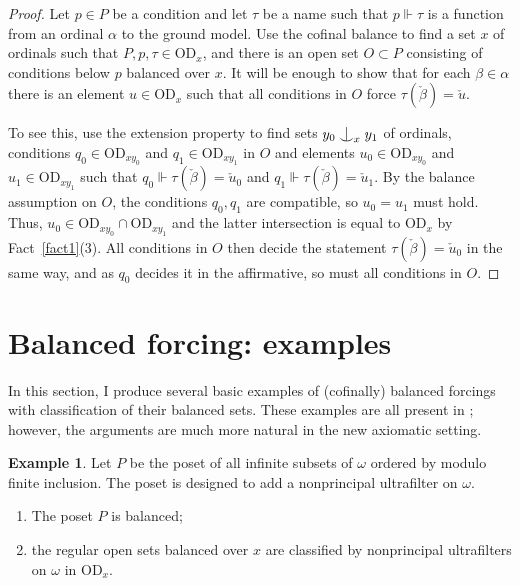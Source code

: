 \documentclass{article}
\newcommand{\ga}{\alpha}
\newcommand{\gb}{\beta}
\newcommand{\gw}{\omega}
\newcommand{\vd}{\mathrm{OD}}
\newcommand{\forkindep}[1][]{%
  \mathrel{
    \mathop{
      \vcenter{
        \hbox{\oalign{\noalign{\kern-.3ex}\hfil$\vert$\hfil\cr
              \noalign{\kern-.7ex}
              $\smile$\cr\noalign{\kern-.3ex}}}
      }
    }\displaylimits_{#1}
  }
}
\theoremstyle{definition}
\newtheorem{example}[theorem]{Example}
\begin{document}
\begin{proof}
Let $p\in P$ be a condition and let $\tau$ be a name such that $p\Vdash\tau$ is a function from an ordinal $\ga$ to the ground model. Use the cofinal balance to find a set $x$ of ordinals such that $P, p, \tau\in\vd_x$, and there is an open set $O\subset P$ consisting of conditions below $p$ balanced over $x$. It will be enough to show that for each $\gb\in\ga$ there is an element $u\in\vd_{x}$ such that all conditions in $O$ force $\tau(\check\gb)=\check u$.


To see this, use the extension property to find sets $y_0\forkindep[x]y_1$ of ordinals, conditions $q_0\in\vd_{xy_0}$ and $q_1\in\vd_{xy_1}$ in $O$ and elements $u_0\in\vd_{xy_0}$ and $u_1\in\vd_{xy_1}$ such that $q_0\Vdash\tau(\check\gb)=\check u_0$ and $q_1\Vdash\tau(\check\gb)=\check u_1$. By the balance assumption on $O$, the conditions $q_0, q_1$ are compatible, so $u_0=u_1$ must hold. Thus, $u_0\in\vd_{xy_0}\cap\vd_{xy_1}$ and the latter intersection is equal to $\vd_x$ by Fact~\ref{fact1}(3). All conditions in $O$ then decide the statement $\tau(\check\gb)=\check u_0$ in the same way, and as $q_0$ decides it in the affirmative, so must all conditions in $O$.
\end{proof}


\section{Balanced forcing: examples}
\label{examplesection}

In this section, I produce several basic examples of (cofinally) balanced forcings with classification of their balanced sets. These examples are all present in \cite{z:geometric}; however, the arguments are much more natural in the new axiomatic setting.


\begin{example}
\label{ufexample1}
Let $P$ be the poset of all infinite subsets of $\gw$ ordered by modulo finite inclusion.  The poset is designed to add a nonprincipal ultrafilter on $\gw$.

\begin{enumerate}
\item The poset $P$ is balanced;
\item the regular open sets balanced over $x$ are classified by nonprincipal ultrafilters on $\gw$ in $\vd_x$.
\end{enumerate}
\end{example}
\end{document}
